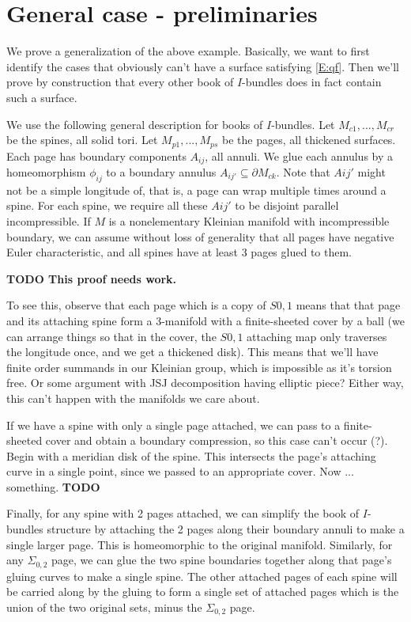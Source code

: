\documentclass[12pt]{amsart}
\theoremstyle{definition}
\theoremstyle{remark}
\newcommand{\bd}{\partial}
\newcommand{\Si}{\Sigma}
\newcommand{\cin}{\subseteq}
\begin{document}
\section{General case - preliminaries}

We prove a generalization of the above example. Basically, we want to first
identify the cases that obviously can't have a surface satisfying \eqref{E:qf}.
Then we'll prove by construction that every other book of $I$-bundles does in
fact contain such a surface.

We use the following general description for books of $I$-bundles. Let
$M_{c1},...,M_{cr}$ be the spines, all solid tori. Let $M_{p1},...,M_{ps}$ be
the pages, all thickened surfaces. Each page has boundary components $A_{ij}$,
all annuli. We glue each annulus by a homeomorphism $\phi_{ij}$ to a boundary
annulus $A_{ij'}\cin \bd M_{ck}$. Note that $Aij'$ might not be a simple
longitude of, that is, a page can wrap multiple times around a spine.  For each
spine, we require all these $Aij'$ to be disjoint parallel incompressible.  If
$M$ is a nonelementary Kleinian manifold with incompressible boundary, we can
assume without loss of generality that all pages have negative Euler
characteristic, and all spines have at least 3 pages glued to them.

{\bf TODO This proof needs work.}

{\tiny

To see this, observe that each page which is a copy of $S0,1$ means that that
page and its attaching spine form a 3-manifold with a finite-sheeted cover by
a ball (we can arrange things so that in the cover, the $S0,1$ attaching map
only traverses the longitude once, and we get a thickened disk).  This means
that we'll have finite order summands in our Kleinian group, which is
impossible as it's torsion free. Or some argument with JSJ decomposition having
elliptic piece? Either way, this can't happen with the manifolds we care about.

If we have a spine with only a single page attached, we can pass to
a finite-sheeted cover and obtain a boundary compression, so this case can't
occur (?). Begin with a meridian disk of the spine.  This intersects the page's
attaching curve in a single point, since we passed to an appropriate cover. Now
... something. {\bf TODO} %

}%

Finally, for any spine with 2 pages attached, we can simplify the book of
$I$-bundles structure by attaching the 2 pages along their boundary annuli to
make a single larger page. This is homeomorphic to the original manifold.
Similarly, for any $\Si_{0,2}$ page, we can glue the two spine boundaries
together along that page's gluing curves to make a single spine. The other
attached pages of each spine will be carried along by the gluing to form
a single set of attached pages which is the union of the two original sets,
minus the $\Si_{0,2}$ page.
\end{document}
